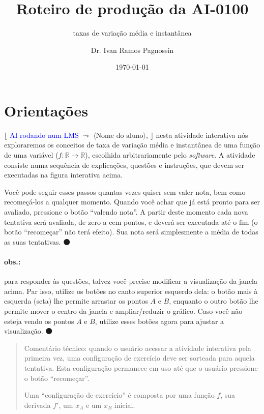 \documentclass[fleqn,12pt]{scrartcl}
\title{Roteiro de produção da AI-0100}
\subtitle{taxas de variação média e instantânea}
\author{Dr. Ivan Ramos Pagnossin}
\date{\today}
\newenvironment{ct}{\begin{quotation}\color{red!30!black}\sffamily\small Comentário técnico:}{\end{quotation}} %
\newcommand\foreign[1]{\textsl{#1}}
\newcommand\proceed{\textcolor{green!50!black}{$\medbullet$}\xspace}
\newcommand\condicional[2]{$\lfloor$%
	\textsf{\textcolor{blue}{{\footnotesize #1}}}
	$\leadsto$ #2%
	$\rfloor$}
\begin{document}
    \maketitle
    
    \section{Orientações}

    \condicional{AI rodando num LMS}{$\langle\text{Nome do aluno}\rangle$,} nesta atividade interativa nós exploraremos os conceitos de taxa de variação média e instantânea de uma função de uma variável ($f: \mathbb{R} \to \mathbb{R}$), escolhida arbitrariamente pelo \foreign{software}. A atividade consiste numa sequência de explicações, questões e instruções, que devem ser executadas na figura interativa acima.

    Você pode seguir esses passos quantas vezes quiser sem valer nota, bem como recomeçá-los a qualquer momento. Quando você achar que já está pronto para ser avaliado, pressione o botão ``valendo nota''. A partir deste momento cada nova tentativa será avaliada, de zero a cem pontos, e deverá ser executada até o fim (o botão ``recomeçar'' não terá efeito). Sua nota será simplesmente a média de todas as suas tentativas. \proceed

    \paragraph{obs.:} para responder às questões, talvez você precise modificar a visualização da janela acima. Par isso, utilize os botões no canto superior esquerdo dela: o botão mais à esquerda (seta) lhe permite arrastar os pontos $A$ e $B$, enquanto o outro botão lhe permite mover o centro da janela e ampliar/reduzir o gráfico. Caso você não esteja vendo os pontos $A$ e $B$, utilize esses botões agora para ajustar a visualização. \proceed

    \begin{ct}
	quando o usuário acessar a atividade interativa pela primeira vez, uma configuração de exercício deve ser sorteada para aquela tentativa. Esta configuração permanece em uso até que o usuário pressione o botão ``recomeçar''.

	Uma ``configuração de exercício'' é composta por uma função $f$, sua derivada $f'$, um $x_A$ e um $x_B$ inicial. 
    \end{ct}

\end{document}
